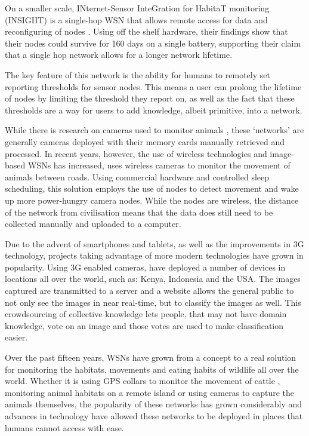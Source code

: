 	On a smaller scale, INternet-Sensor InteGration for HabitaT monitoring (INSIGHT) is a single-hop WSN that allows remote access for data and reconfiguring of nodes \cite{Demirbas}. Using off the shelf hardware, their findings show that their nodes could survive for 160 days on a single battery, supporting their claim that a single hop network allows for a longer network lifetime. 
	
	The key feature of this network is the ability for humans to remotely set reporting thresholds for sensor nodes. This means a user can prolong the lifetime of nodes by limiting the threshold they report on, as well as the fact that these thresholds are a way for users to add knowledge, albeit primitive, into a network.

	While there is research on cameras used to monitor animals \cite{Kays2009, Ahumada2011a}, these ‘networks’ are generally cameras deployed with their memory cards manually retrieved and processed. In recent years, however, the use of wireless technologies and image-based WSNs has increased, \cite{Garcia-Sanchez2010b} uses wireless cameras to monitor the movement of animals between roads. Using commercial hardware and controlled sleep scheduling, this solution employs the use of nodes to detect movement and wake up more power-hungry camera nodes. While the nodes are wireless, the distance of the network from civilisation means that the data does still need to be collected manually and uploaded to a computer.

	Due to the advent of smartphones and tablets, as well as the improvements in 3G technology, projects taking advantage of more modern technologies have grown in popularity. Using 3G enabled cameras, \cite{ZSL} have deployed a number of devices in locations all over the world, such as: Kenya, Indonesia and the USA. The images captured are transmitted to a server and a website allows the general public to not only see the images in near real-time, but to classify the images as well. This crowdsourcing of collective knowledge lets people, that may not have domain knowledge, vote on an image and those votes are used to make classification easier.

	Over the past fifteen years, WSNs have grown from a concept to a real solution for monitoring the habitats, movements and eating habits of wildlife all over the world. Whether it is using GPS collars to monitor the movement of cattle \cite{Guo2006}, monitoring animal habitats on a remote island or using cameras to capture the animals themselves, the popularity of these networks has grown considerably and advances in technology have allowed these networks to be deployed in places that humans cannot access with ease.
	

